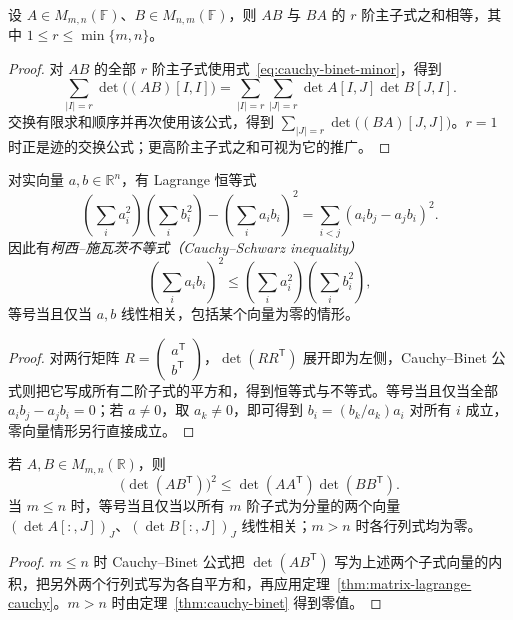 \begin{proposition}
\label{prop:matrix-principal-minor-sums}
设 $A\in M_{m,n}(\mathbb F)$、$B\in M_{n,m}(\mathbb F)$，则 $AB$ 与 $BA$ 的 $r$ 阶主子式之和相等，其中 $1\le r\le\min\{m,n\}$。
\end{proposition}
\begin{proof}
对 $AB$ 的全部 $r$ 阶主子式使用式~\eqref{eq:cauchy-binet-minor}，得到
\[
 \sum_{|I|=r}\det\bigl((AB)[I,I]\bigr)
 =\sum_{|I|=r}\sum_{|J|=r}\det A[I,J]\det B[J,I].
\]
交换有限求和顺序并再次使用该公式，得到 $\sum_{|J|=r}\det\bigl((BA)[J,J]\bigr)$。$r=1$ 时正是迹的交换公式；更高阶主子式之和可视为它的推广。
\end{proof}

\begin{theorem}
\label{thm:matrix-lagrange-cauchy}
对实向量 $a,b\in\mathbb R^n$，有 Lagrange 恒等式
\begin{equation}
 \left(\sum_i a_i^2\right)\left(\sum_i b_i^2\right)
 -\left(\sum_i a_ib_i\right)^2
 =\sum_{i<j}(a_ib_j-a_jb_i)^2.
 \label{eq:matrix-lagrange}
\end{equation}
因此有\emph{柯西--施瓦茨不等式（Cauchy--Schwarz inequality）}
\begin{equation}
 \left(\sum_i a_ib_i\right)^2
 \le\left(\sum_i a_i^2\right)\left(\sum_i b_i^2\right),
 \label{eq:matrix-cauchy-schwarz}
\end{equation}
等号当且仅当 $a,b$ 线性相关，包括某个向量为零的情形。
\end{theorem}
\begin{proof}
对两行矩阵 $R=\begin{pmatrix}a^{\mathsf T}\\b^{\mathsf T}\end{pmatrix}$，$\det(RR^{\mathsf T})$ 展开即为左侧，Cauchy--Binet 公式则把它写成所有二阶子式的平方和，得到恒等式与不等式。等号当且仅当全部 $a_ib_j-a_jb_i=0$；若 $a\ne0$，取 $a_k\ne0$，即可得到 $b_i=(b_k/a_k)a_i$ 对所有 $i$ 成立，零向量情形另行直接成立。
\end{proof}

\begin{corollary}
\label{cor:matrix-determinant-cauchy}
若 $A,B\in M_{m,n}(\mathbb R)$，则
\begin{equation}
 \bigl(\det(AB^{\mathsf T})\bigr)^2
 \le\det(AA^{\mathsf T})\det(BB^{\mathsf T}).
 \label{eq:matrix-determinant-cauchy}
\end{equation}
当 $m\le n$ 时，等号当且仅当以所有 $m$ 阶子式为分量的两个向量 $(\det A[:,J])_J$、$(\det B[:,J])_J$ 线性相关；$m>n$ 时各行列式均为零。
\end{corollary}
\begin{proof}
$m\le n$ 时 Cauchy--Binet 公式把 $\det(AB^{\mathsf T})$ 写为上述两个子式向量的内积，把另外两个行列式写为各自平方和，再应用定理~\ref{thm:matrix-lagrange-cauchy}。$m>n$ 时由定理~\ref{thm:cauchy-binet} 得到零值。
\end{proof}

